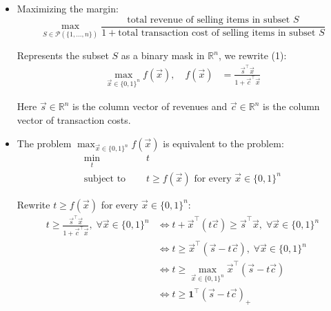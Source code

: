 \begin{solution}
    \begin{itemize}

        \item[(a)] Maximizing the margin:
              \begin{equation}
                  \max_{S \in \mathcal{P}(\{1,\dots,n\})}
                  \frac{\text{total revenue of selling items in subset } S}%
                  {1 + \text{total transaction cost of selling items in subset } S} 
              \end{equation}

              Represents the subset $S$ as a binary mask in $\mathbb{R}^n$, we rewrite (1):
              \begin{align*}
                  \max_{\vec{x} \in \{0,1\}^n} f(\vec{x}), \quad
                  f(\vec{x}) & = \frac{\vec{s}^\top \vec{x}}{1 + \vec{c}^\top \vec{x}}
              \end{align*}

              Here $\vec{s} \in \mathbb{R}^n$ is the column vector of revenues
              and $\vec{c} \in \mathbb{R}^n$ is the column vector of transaction costs.

        \item[(b)] The problem $\max_{\vec{x} \in \{0,1\}^n} f(\vec{x})$ is equivalent
              to the problem:
              \begin{align*}
                  \min_t \quad             & t                                                         \\
                  \text{subject to } \quad & t \ge f(\vec{x}) \text{ for every } \vec{x} \in \{0,1\}^n
              \end{align*}

              Rewrite $t \ge f(\vec{x})$ for every $\vec{x} \in \{0,1\}^n$:
              \begin{align*}
                  t \ge \frac{\vec{s}^\top \vec{x}}{1 + \vec{c}^\top \vec{x}},
                  \; \forall \vec{x} \in \{0,1\}^n
                   & \Leftrightarrow t + \vec{x}^\top(t\vec{c}) \ge \vec{s}^\top \vec{x},
                  \; \forall \vec{x} \in \{0,1\}^n                                                       \\
                   & \Leftrightarrow t \ge \vec{x}^\top(\vec{s} - t\vec{c}),
                  \; \forall \vec{x} \in \{0,1\}^n                                                       \\
                   & \Leftrightarrow t \ge \max_{\vec{x} \in \{0,1\}^n} \vec{x}^\top(\vec{s} - t\vec{c}) \\
                   & \Leftrightarrow t \ge \mathbf{1}^\top(\vec{s} - t\vec{c})_+
              \end{align*}


\end{itemize}
\end{solution}
